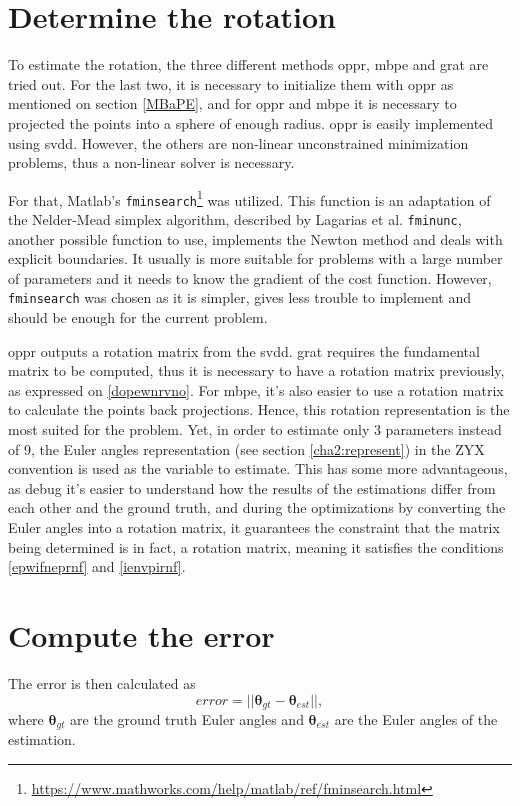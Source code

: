 \section{Determine the rotation}
To estimate the rotation, the three different methods \acrshort{oppr}, \acrshort{mbpe} and \acrshort{grat} are tried out. For the last two, it is necessary to initialize them with \acrshort{oppr} as mentioned on section \ref{MBaPE}, and for \acrshort{oppr} and \acrshort{mbpe} it is necessary to projected the points into a sphere of enough radius. \acrshort{oppr} is easily implemented using \acrshort{svdd}. However, the others are non-linear unconstrained minimization problems, thus a non-linear solver is necessary. 

For that, Matlab's \texttt{fminsearch}\footnote{\href{https://www.mathworks.com/help/matlab/ref/fminsearch.html}{https://www.mathworks.com/help/matlab/ref/fminsearch.html}} was utilized. This function is an adaptation of the Nelder-Mead simplex algorithm, described by Lagarias et al. \cite{lagarias} \texttt{fminunc}, another possible function to use, implements the Newton method and deals with explicit boundaries. It usually is more suitable for problems with a large number of parameters and it needs to know the gradient of the cost function. However, \texttt{fminsearch} was chosen as it is simpler, gives less trouble to implement and should be enough for the current problem.

\acrshort{oppr} outputs a rotation matrix from the \acrshort{svdd}.
\acrshort{grat} requires the fundamental matrix to be computed, thus it is necessary to have a rotation matrix previously, as expressed on \ref{dopewnrvno}. For \acrshort{mbpe}, it's also easier to use a rotation matrix to calculate the points back projections. Hence, this rotation representation is the most suited for the problem. Yet, in order to estimate only 3 parameters instead of 9, the Euler angles representation (see section \ref{cha2:represent}) in the ZYX convention is used as the variable to estimate. This has some more advantageous, as debug it's easier to understand how the results of the estimations differ from each other and the ground truth, and during the optimizations by converting the Euler angles into a rotation matrix, it guarantees the constraint that the matrix being determined is in fact, a rotation matrix, meaning it satisfies the conditions \ref{epwifneprnf} and \ref{ienvpirnf}.

\section{Compute the error}
The error is then calculated as
\begin{equation}
	error = ||{\mathbf{ \theta}_{gt}-\mathbf{ \theta}_{est}}||,
\end{equation}
where $\mathbf{ \theta}_{gt}$ are the ground truth Euler angles and $\mathbf{ \theta}_{est}$ are the Euler angles of the estimation.


